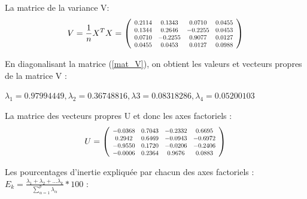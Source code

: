 \documentclass{article}
\newcommand\scalemath[2]{\scalebox{#1}{\mbox{\ensuremath{\displaystyle #2}}}} %
\begin{document}
La matrice de la variance V:
\begin{equation}
V=\frac{1}{n}X^{T}X=
\left( 	
\scalemath{0.75}{
	\begin{array}{cccc} 
	0.2114&  0.1343&  0.0710& 0.0455\\
    0.1344&  0.2646& -0.2255& 0.0453\\
    0.0710& -0.2255&  0.9077& 0.0127\\
    0.0455&  0.0453&  0.0127& 0.0988\\
    \end{array}
    }
\right)
\label{mat_V}
\end{equation}

En diagonalisant la matrice (\ref{mat_V}), on obtient les valeurs et vecteurs propres de la matrice V :
\begin{center}
$\lambda_{1}=0.97994449,\lambda_{2}=0.36748816,\lambda{3}=0.08318286,\lambda_{4}=0.05200103$

\end{center}

La matrice des vecteurs propres U et donc les axes factoriels :
\begin{equation}
U=
\left(
\scalemath{0.75}{
	\begin{array}{cccc} 
    -0.0368& 0.7043& -0.2332&  0.6695\\
    0.2942& 0.6469& -0.0943& -0.6972\\
    -0.9550& 0.1720& -0.0206& -0.2406\\
    -0.0006& 0.2364&  0.9676&  0.0883\\
    \end{array}
    }
\right) 
\end{equation}

Les pourcentages d'inertie expliquée par chacun des axes factoriels : $E_{k}=\frac{\lambda_{1}+\lambda_{2}+...\lambda_{k}}{\sum_{\alpha=1}^{p}\lambda_{\alpha}}*100$ :

\begin{table}[!h]
\centering
\caption{Inertie expliquée par les axes factoriels}
\label{Table3.1}

\label{2.1.tab_inertie}
\end{table}
\end{document}
